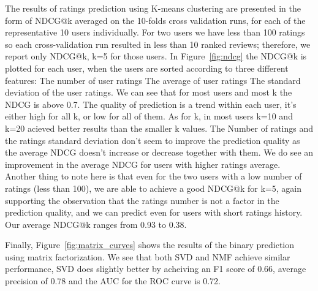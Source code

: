 The results of ratings prediction using K-means clustering are presented in the form of NDCG@k averaged on the 10-folds cross validation runs, for each of the representative 10 users individually. For two users we have less than 100 ratings so each cross-validation run resulted in less than 10 ranked reviews; therefore, we report only NDCG@k, k=5 for those users. In Figure~\ref{fig:ndcg} the NDCG@k is plotted for each user, when the users are sorted according to three different features: \blackone The number of user ratings \blacktwo The average of user ratings \blackthree The standard deviation of the user ratings. We can see that for most users and most k the NDCG is above 0.7. The quality of prediction is a trend within each user, it's either high for all k, or low for all of them. As for k, in most users k=10 and k=20 acieved better results than the smaller k values. The Number of ratings and the ratings standard deviation don't seem to improve the prediction quality as the average NDCG doesn't increase or decrease together with them. We do see an improvement in the average NDCG for users with higher ratings average. Another thing to note here is that even for the two users with a low number of ratings (less than 100), we are able to achieve a good NDCG@k for k=5, again supporting the observation that the ratings number is not a factor in the prediction quality, and we can predict even for users with short ratings history. Our average NDCG@k ranges from 0.93 to 0.38.


Finally, Figure~\ref{fig:matrix_curves} shows the results of the binary prediction using matrix factorization. 
We see that both SVD and NMF achieve similar performance, SVD does slightly better by acheiving an F1 score of 0.66, average precision of 0.78 and the AUC for the ROC curve is 0.72.
